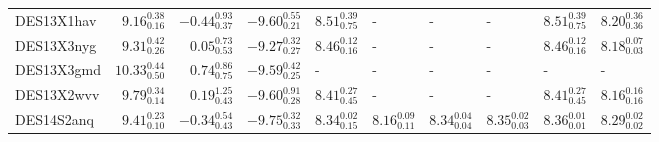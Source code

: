 \documentclass[fleqn,usenatbib,]{mnras}
\begin{document}
\begin{table}
\begin{threeparttable}
\begin{tabular}{lrrrllllll}
DES13X1hav &   $9.16 _{\scriptscriptstyle 0.16} ^{\scriptscriptstyle 0.38}$ &  $-0.44 _{\scriptscriptstyle 0.37} ^{\scriptscriptstyle 0.93}$ &   $-9.60 _{\scriptscriptstyle 0.21} ^{\scriptscriptstyle 0.55}$ &  $8.51 _{\scriptscriptstyle 0.75} ^{\scriptscriptstyle 0.39}$ &                                                             - &                                                             - &                                                             - &  $8.51 _{\scriptscriptstyle 0.75} ^{\scriptscriptstyle 0.39}$ &   $8.20 _{\scriptscriptstyle 0.36} ^{\scriptscriptstyle 0.36}$ \\
DES13X3nyg &   $9.31 _{\scriptscriptstyle 0.26} ^{\scriptscriptstyle 0.42}$ &   $0.05 _{\scriptscriptstyle 0.53} ^{\scriptscriptstyle 0.73}$ &   $-9.27 _{\scriptscriptstyle 0.27} ^{\scriptscriptstyle 0.32}$ &  $8.46 _{\scriptscriptstyle 0.16} ^{\scriptscriptstyle 0.12}$ &                                                             - &                                                             - &                                                             - &  $8.46 _{\scriptscriptstyle 0.16} ^{\scriptscriptstyle 0.12}$ &   $8.18 _{\scriptscriptstyle 0.03} ^{\scriptscriptstyle 0.07}$ \\
DES13X3gmd &  $10.33 _{\scriptscriptstyle 0.50} ^{\scriptscriptstyle 0.44}$ &   $0.74 _{\scriptscriptstyle 0.75} ^{\scriptscriptstyle 0.86}$ &   $-9.59 _{\scriptscriptstyle 0.25} ^{\scriptscriptstyle 0.42}$ &                                                             - &                                                             - &                                                             - &                                                             - &                                                             - &                                                              - \\
DES13X2wvv &   $9.79 _{\scriptscriptstyle 0.14} ^{\scriptscriptstyle 0.34}$ &   $0.19 _{\scriptscriptstyle 0.43} ^{\scriptscriptstyle 1.25}$ &   $-9.60 _{\scriptscriptstyle 0.28} ^{\scriptscriptstyle 0.91}$ &  $8.41 _{\scriptscriptstyle 0.45} ^{\scriptscriptstyle 0.27}$ &                                                             - &                                                             - &                                                             - &  $8.41 _{\scriptscriptstyle 0.45} ^{\scriptscriptstyle 0.27}$ &   $8.16 _{\scriptscriptstyle 0.16} ^{\scriptscriptstyle 0.16}$ \\
DES14S2anq &   $9.41 _{\scriptscriptstyle 0.10} ^{\scriptscriptstyle 0.23}$ &  $-0.34 _{\scriptscriptstyle 0.43} ^{\scriptscriptstyle 0.54}$ &   $-9.75 _{\scriptscriptstyle 0.33} ^{\scriptscriptstyle 0.32}$ &  $8.34 _{\scriptscriptstyle 0.15} ^{\scriptscriptstyle 0.02}$ &  $8.16 _{\scriptscriptstyle 0.11} ^{\scriptscriptstyle 0.09}$ &  $8.34 _{\scriptscriptstyle 0.04} ^{\scriptscriptstyle 0.04}$ &  $8.35 _{\scriptscriptstyle 0.03} ^{\scriptscriptstyle 0.02}$ &  $8.36 _{\scriptscriptstyle 0.01} ^{\scriptscriptstyle 0.01}$ &   $8.29 _{\scriptscriptstyle 0.02} ^{\scriptscriptstyle 0.02}$ \\

\end{tabular}
\end{threeparttable}
\end{table}
\end{document}
